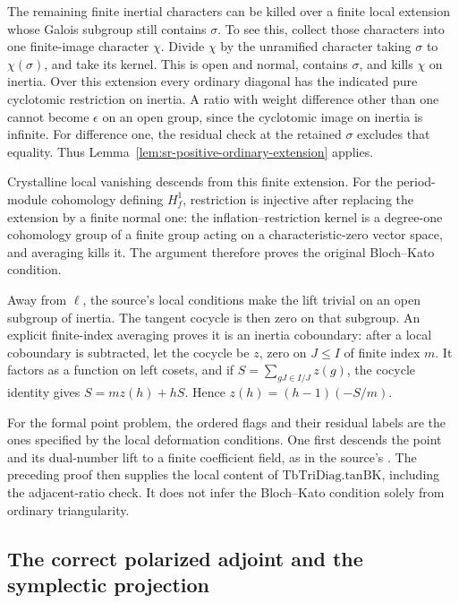 The remaining finite inertial characters can be killed over a
finite local extension whose Galois subgroup still contains \(\sigma\).
To see this, collect those characters into one finite-image character
\(\chi\). Divide \(\chi\) by the unramified character taking
\(\sigma\) to \(\chi(\sigma)\), and take its kernel.
This is open and normal, contains \(\sigma\), and kills \(\chi\)
on inertia. Over this extension every ordinary diagonal has the
indicated pure cyclotomic restriction on inertia.
A ratio with weight difference other than one cannot become
\(\epsilon\) on an open group, since the cyclotomic image on inertia
is infinite. For difference one, the residual check at the retained
\(\sigma\) excludes that equality.
Thus Lemma~\ref{lem:sr-positive-ordinary-extension} applies.

Crystalline local vanishing descends from this finite extension.
For the period-module cohomology defining \(H^1_f\), restriction
is injective after replacing the extension by a finite normal one:
the inflation--restriction kernel is a degree-one cohomology group
of a finite group acting on a characteristic-zero vector space,
and averaging kills it.
The argument therefore proves the original Bloch--Kato condition.

Away from \(\ell\), the source's local conditions make the lift
trivial on an open subgroup of inertia.
The tangent cocycle is then zero on that subgroup.
An explicit finite-index averaging proves it is an inertia
coboundary: after a local coboundary is subtracted, let the cocycle
be \(z\), zero on \(J\leq I\) of finite index \(m\).
It factors as a function on left cosets, and if
\(S=\sum_{gJ\in I/J}z(g)\), the cocycle identity gives
\(S=mz(h)+hS\). Hence \(z(h)=(h-1)(-S/m)\).

For the formal point problem, the ordered flags and their residual
labels are the ones specified by the local deformation conditions.
One first descends the point and its dual-number lift to a finite
coefficient field, as in the source's
.
The preceding proof then supplies the local content of
\(\mathrm{TbTriDiag.tanBK}\), including the adjacent-ratio check.
It does not infer the Bloch--Kato condition solely from ordinary
triangularity.

\subsection{The correct polarized adjoint and the symplectic projection}
\label{sec:sr-rank-four-adjoint-projection}

